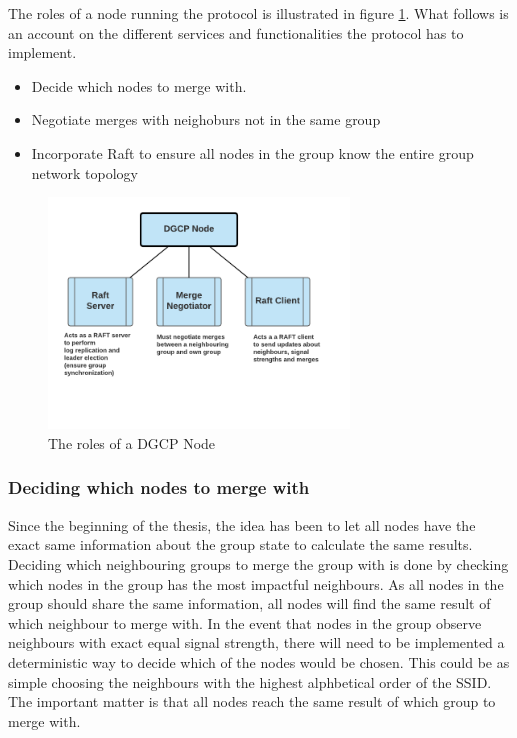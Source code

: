 The roles of a node running the protocol is illustrated in figure \ref{fig:dgcproles}. What follows is an account on the different services and functionalities the protocol
has to implement.  
\begin{itemize}
	\item Decide which nodes to merge with. 
	\item Negotiate merges with neighoburs not in the same group
	\item Incorporate Raft to ensure all nodes in the group know the entire group network topology 
\end{itemize}

\begin{figure}
	\centering
	\includegraphics[width=8cm]{Images/dgcpnode.png}
		\caption{The roles of a DGCP Node }%
		\label{fig:dgcproles}%
\end{figure}



\subsubsection{Deciding which nodes to merge with}
Since the beginning of the thesis, the idea has been to let all nodes have the exact same information about the group state to calculate the same results. Deciding
which neighbouring groups to merge the group with is done by checking which nodes in the group has the most impactful neighbours. As all nodes in the group should share
the same information, all nodes will find the same result of which neighbour to merge with.
In the event that nodes in the group observe neighbours with exact equal signal strength, there will need to be implemented a deterministic way to decide which of the nodes would be chosen.
This could be as simple choosing the neighbours with the highest alphbetical order of the SSID. The important matter is that all nodes reach the same result of which group to merge with. 

